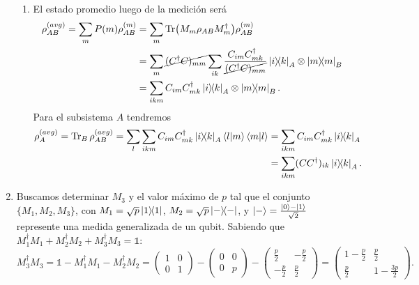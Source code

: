 \documentclass{scrartcl}
\DeclareRobustCommand{\[}{\begin{equation}}
\DeclareRobustCommand{\]}{\end{equation}}
\begin{document}
\begin{enumerate}
\begin{enumerate}
        
        \item El estado promedio luego de la medición será
        \begin{align}
            \rho^{(avg)}_{AB} = \sum_m P(m) \rho^{(m)}_{AB} &= \sum_m \Tr(M_m \rho_{AB} M_m^\dagger)  \rho^{(m)}_{AB} \\
                &= \sum_m \cancel{(C^\dagger C)_{mm}} \sum_{ik} \frac{C_{im} C_{mk}^\dagger}{\cancel{(C^\dagger C)_{mm}}} \dyad{i}{k}_A \otimes \dyad{m}{m}_B \\
                &= \sum_{ikm} C_{im} C_{mk}^\dagger \dyad{i}{k}_A \otimes \dyad{m}{m}_B.
        \end{align}
        Para el subsistema $A$ tendremos
        \begin{align}
            \rho^{(avg)}_{A} = \Tr_B \rho^{(avg)}_{AB} = \sum_l \sum_{ikm} C_{im} C_{mk}^\dagger \dyad{i}{k}_A \bra{l}\ket{m}\bra{m}\ket{l} &= \sum_{ikm} C_{im} C_{mk}^\dagger \dyad{i}{k}_A \\
                &= \sum_{ikm} (C C^\dagger)_{ik} \dyad{i}{k}_A.
        \end{align}
        
    \end{enumerate}
    
    
    
    \item Buscamos determinar $M_3$ y el valor máximo de $p$ tal que el conjunto $\{ M_1, M_2, M_3 \}$, con $M_1 = \sqrt{p} \dyad{1}{1}$, $M_2 = \sqrt{p} \dyad{-}{-}$, y $\ket{-} = \frac{\ket{0} - \ket{1}}{\sqrt{2}}$ represente una medida generalizada de un qubit. Sabiendo que $M_1^\dagger M_1 + M_2^\dagger M_2 + M_3^\dagger M_3 = \mathds{1}$:
    \[
        M_3^\dagger M_3 = \mathds{1} - M_1^\dagger M_1 - M_2^\dagger M_2 =
        \begin{pmatrix}
            1 & 0 \\
            0 & 1
        \end{pmatrix}
        -
        \begin{pmatrix}
            0 & 0 \\
            0 & p
        \end{pmatrix}
        -
        \begin{pmatrix}
            \frac{p}{2} & -\frac{p}{2} \\
            -\frac{p}{2} & \frac{p}{2}
        \end{pmatrix}
        =
        \begin{pmatrix}
            1-\frac{p}{2} & \frac{p}{2} \\
            \frac{p}{2} & 1-\frac{3p}{2}
        \end{pmatrix}.
    \]
    

\end{enumerate}
\end{document}
